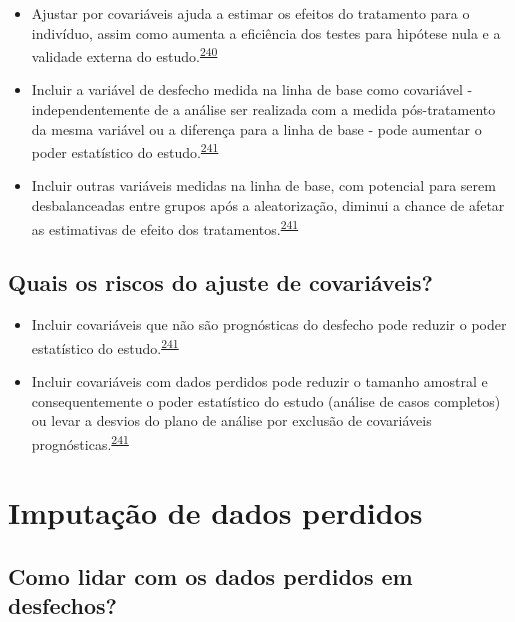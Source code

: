 \documentclass[
  a4paper,
]{book}
\begin{document}
\begin{itemize}
\item
  Ajustar por covariáveis ajuda a estimar os efeitos do tratamento para o indivíduo, assim como aumenta a eficiência dos testes para hipótese nula e a validade externa do estudo.\textsuperscript{\protect\hyperlink{ref-Hauck1998}{240}}
\item
  Incluir a variável de desfecho medida na linha de base como covariável - independentemente de a análise ser realizada com a medida pós-tratamento da mesma variável ou a diferença para a linha de base - pode aumentar o poder estatístico do estudo.\textsuperscript{\protect\hyperlink{ref-Kahan2014}{241}}
\item
  Incluir outras variáveis medidas na linha de base, com potencial para serem desbalanceadas entre grupos após a aleatorização, diminui a chance de afetar as estimativas de efeito dos tratamentos.\textsuperscript{\protect\hyperlink{ref-Kahan2014}{241}}
\end{itemize}

\hypertarget{quais-os-riscos-do-ajuste-de-covariuxe1veis}{%
\subsection{Quais os riscos do ajuste de covariáveis?}\label{quais-os-riscos-do-ajuste-de-covariuxe1veis}}

\begin{itemize}
\item
  Incluir covariáveis que não são prognósticas do desfecho pode reduzir o poder estatístico do estudo.\textsuperscript{\protect\hyperlink{ref-Kahan2014}{241}}
\item
  Incluir covariáveis com dados perdidos pode reduzir o tamanho amostral e consequentemente o poder estatístico do estudo (análise de casos completos) ou levar a desvios do plano de análise por exclusão de covariáveis prognósticas.\textsuperscript{\protect\hyperlink{ref-Kahan2014}{241}}
\end{itemize}

\hypertarget{imputacao-dados}{%
\section{Imputação de dados perdidos}\label{imputacao-dados}}

\hypertarget{como-lidar-com-os-dados-perdidos-em-desfechos}{%
\subsection{Como lidar com os dados perdidos em desfechos?}\label{como-lidar-com-os-dados-perdidos-em-desfechos}}
\end{document}
